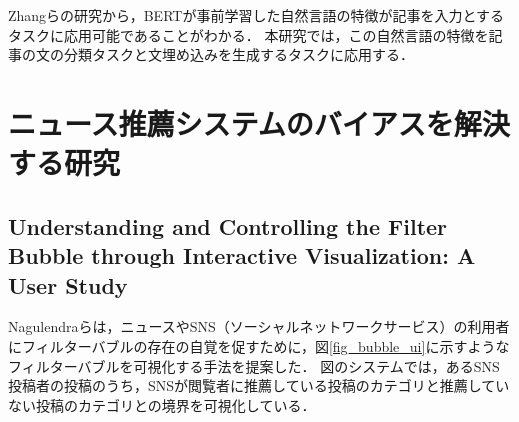 \documentclass[12pt,a4j,dvipdfmx]{jreport}
\begin{document}
Zhangらの研究から，BERTが事前学習した自然言語の特徴が記事を入力とするタスクに応用可能であることがわかる．
本研究では，この自然言語の特徴を記事の文の分類タスクと文埋め込みを生成するタスクに応用する．





\section{ニュース推薦システムのバイアスを解決する研究}

\subsection{Understanding and Controlling the Filter Bubble through Interactive Visualization: A User Study}
Nagulendraらは，ニュースやSNS（ソーシャルネットワークサービス）の利用者にフィルターバブルの存在の自覚を促すために，図\ref{fig_bubble_ui}に示すようなフィルターバブルを可視化する手法を提案した\cite{nagulendra_understanding_2014}．
図のシステムでは，あるSNS投稿者の投稿のうち，SNSが閲覧者に推薦している投稿のカテゴリと推薦していない投稿のカテゴリとの境界を可視化している．
\end{document}
